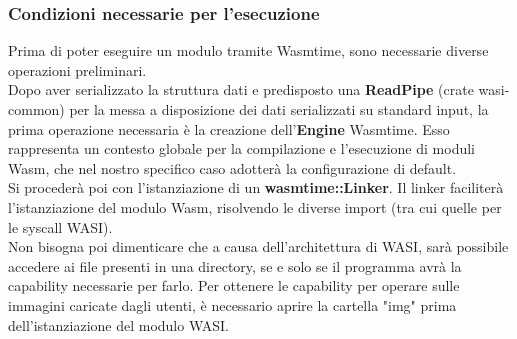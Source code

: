 \subsubsection{Condizioni necessarie per l'esecuzione}
Prima di poter eseguire un modulo tramite Wasmtime, sono necessarie diverse operazioni preliminari.
\\Dopo aver serializzato la struttura dati e predisposto una \textbf{ReadPipe} (crate wasi-common) per la messa a disposizione dei dati serializzati su standard input, la prima operazione necessaria è la creazione dell'\textbf{Engine} Wasmtime.
Esso rappresenta un contesto globale per la compilazione e l'esecuzione di moduli Wasm, che nel nostro specifico caso adotterà la configurazione di default.
\\Si procederà poi con l'istanziazione di un \textbf{wasmtime::Linker}. Il linker faciliterà l'istanziazione del modulo Wasm, risolvendo le diverse import (tra cui quelle per le syscall WASI).
\\Non bisogna poi dimenticare che a causa dell'architettura di WASI, sarà possibile accedere ai file presenti in una directory, se e solo se il programma avrà la capability necessarie per farlo. 
Per ottenere le capability per operare sulle immagini caricate dagli utenti, è necessario aprire la cartella "img" prima dell'istanziazione del modulo WASI.

